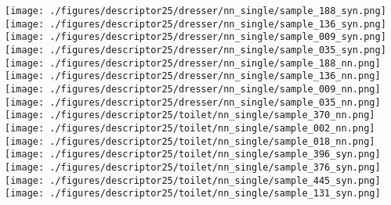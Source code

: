 \documentclass[10pt,twocolumn,letterpaper]{article}
\begin{document}
\begin{figure*}[h]
     \texttt{[image: ./figures/descriptor25/dresser/nn\_single/sample\_188\_syn.png]}          \hspace{-1mm} 
     \texttt{[image: ./figures/descriptor25/dresser/nn\_single/sample\_136\_syn.png]}          \hspace{-1mm} 
     \texttt{[image: ./figures/descriptor25/dresser/nn\_single/sample\_009\_syn.png]}          \hspace{-1mm}  
     \texttt{[image: ./figures/descriptor25/dresser/nn\_single/sample\_035\_syn.png]}          
      \texttt{[image: ./figures/descriptor25/dresser/nn\_single/sample\_188\_nn.png]}          \hspace{-1mm} 
     \texttt{[image: ./figures/descriptor25/dresser/nn\_single/sample\_136\_nn.png]}          \hspace{-1mm} 
     \texttt{[image: ./figures/descriptor25/dresser/nn\_single/sample\_009\_nn.png]}          \hspace{-1mm} 
     \texttt{[image: ./figures/descriptor25/dresser/nn\_single/sample\_035\_nn.png]}          \hspace{-1mm} \\
        \texttt{[image: ./figures/descriptor25/toilet/nn\_single/sample\_370\_nn.png]} \hspace{-3.5mm}   
       \texttt{[image: ./figures/descriptor25/toilet/nn\_single/sample\_002\_nn.png]}\hspace{-2.5mm}               
        \texttt{[image: ./figures/descriptor25/toilet/nn\_single/sample\_018\_nn.png]}         \hspace{-2.5mm}  
       \texttt{[image: ./figures/descriptor25/toilet/nn\_single/sample\_396\_syn.png]}          \hspace{-2.5mm}   
     \texttt{[image: ./figures/descriptor25/toilet/nn\_single/sample\_376\_syn.png]}          \hspace{-2.5mm}   
      \texttt{[image: ./figures/descriptor25/toilet/nn\_single/sample\_445\_syn.png]}          \hspace{-2.5mm}   
     \texttt{[image: ./figures/descriptor25/toilet/nn\_single/sample\_131\_syn.png]}          \hspace{-3.5mm}   

\end{figure*}
\end{document}
